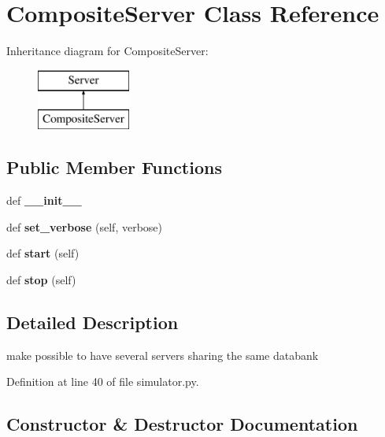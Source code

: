 \section{Composite\+Server Class Reference}
\label{classmodbus__tk_1_1simulator_1_1_composite_server}
Inheritance diagram for Composite\+Server\+:\begin{figure}[H]
\begin{center}
\leavevmode
\includegraphics[height=2.000000cm]{classmodbus__tk_1_1simulator_1_1_composite_server}
\end{center}
\end{figure}
\subsection*{Public Member Functions}
\begin{DoxyCompactItemize}
\item 
def {\bf \+\_\+\+\_\+init\+\_\+\+\_\+}
\item 
def {\bf set\+\_\+verbose} (self, verbose)
\item 
def {\bf start} (self)
\item 
def {\bf stop} (self)
\end{DoxyCompactItemize}


\subsection{Detailed Description}
\begin{DoxyVerb}make possible to have several servers sharing the same databank\end{DoxyVerb}
 

Definition at line 40 of file simulator.\+py.



\subsection{Constructor \& Destructor Documentation}

